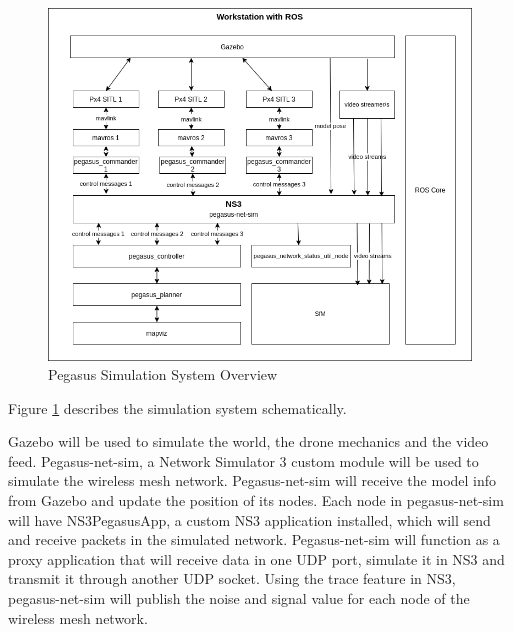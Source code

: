 \begin{figure} \label{fig:system-simulation-overview}
  \centering
  \includegraphics[width=5in]{figures/methodology/system-simulation-overview}
  \caption[Pegasus Simulation System Overview]{\small Pegasus Simulation System Overview}
\end{figure}

Figure \ref{fig:system-simulation-overview} describes the simulation system schematically.

Gazebo will be used to simulate the world, the drone mechanics and the video feed. Pegasus-net-sim, a Network Simulator 3 custom module will be used to simulate the wireless mesh network. Pegasus-net-sim will receive the model info from Gazebo and update the position of its nodes. Each node in pegasus-net-sim will have NS3PegasusApp, a custom NS3 application installed, which will send and receive packets in the simulated network. Pegasus-net-sim will function as a proxy application that will receive data in one UDP port, simulate it in NS3 and transmit it through another UDP socket. Using the trace feature in NS3, pegasus-net-sim will publish the noise and signal value for each node of the wireless mesh network.

\FloatBarrier
